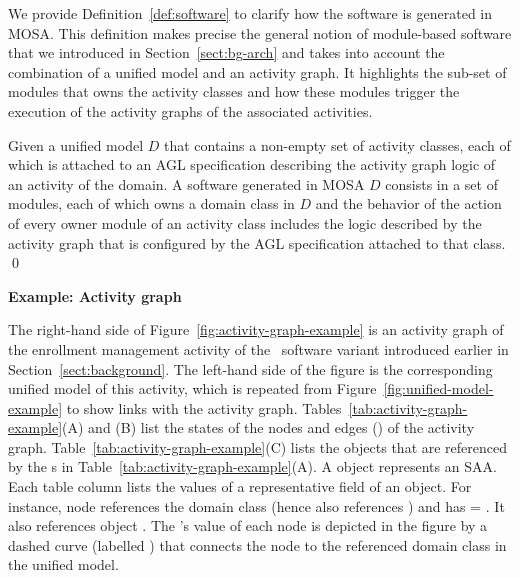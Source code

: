 We provide Definition~\ref{def:software} to clarify how the software is generated in MOSA. This definition makes precise the general notion of module-based software that we introduced in Section~\ref{sect:bg-arch} and takes into account the combination of a unified model and an activity graph. It highlights the sub-set of modules that owns the activity classes and how these modules trigger the execution of the activity graphs of the associated activities.
%
\begin{definition} \label{def:software}
	Given a unified model $D$ that contains a non-empty set of activity classes, each of which is attached to an AGL specification describing the activity graph logic of an activity of the domain. A software generated in MOSA \wrt $D$ consists in a set of modules, each of which owns a domain class in $D$ and the behavior of the  action of every owner module of an activity class includes the logic described by the activity graph that is configured by the AGL specification attached to that class. \qed
\end{definition}
\noindent\textbf{Example: Activity graph}

The right-hand side of Figure~\ref{fig:activity-graph-example} is an activity graph of the enrollment management activity of the \courseman~software variant introduced earlier in Section~\ref{sect:background}. The left-hand side of the figure is the corresponding unified model of this activity, which is repeated from Figure~\ref{fig:unified-model-example} to show links with the activity graph. 
Tables~\ref{tab:activity-graph-example}(A) and (B) list the states of the nodes and edges (\resp) of the activity graph. Table~\ref{tab:activity-graph-example}(C) lists the  objects that are referenced by the s in Table~\ref{tab:activity-graph-example}(A). A  object represents an SAA. Each table column lists the values of a representative field of an object.
%
For instance, node  references the domain class  (hence also references ) and has  = . It also references object . The 's value of each node is depicted in the figure by a dashed curve (labelled ) that connects the node to the referenced domain class in the unified model.

